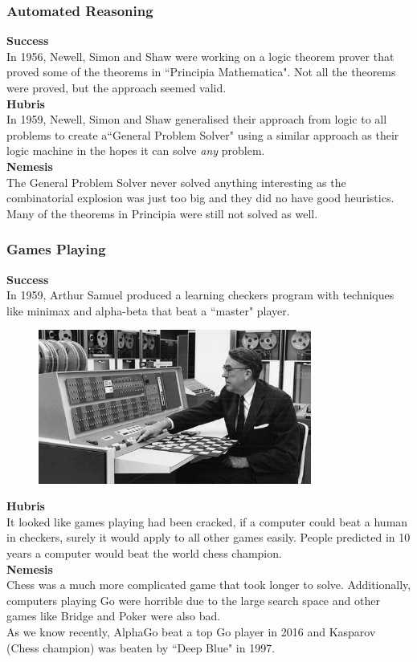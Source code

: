 \documentclass{article}
\newcommand{\n}[0]{\\[\baselineskip]}
\begin{document}
\subsubsection{Automated Reasoning}
\textbf{Success} \\
In 1956, Newell, Simon and Shaw were working on a logic theorem prover that proved some of the theorems in ``Principia Mathematica". Not all the theorems were proved, but the approach seemed valid. 
\n
\textbf{Hubris} \\
In 1959, Newell, Simon and Shaw generalised their approach from logic to all problems to create a``General Problem Solver" using a similar approach as their logic machine in the hopes it can solve \textit{any} problem.
\n
\textbf{Nemesis} \\
The General Problem Solver never solved anything interesting as the combinatorial explosion was just too big and they did no have good heuristics. Many of the theorems in Principia were still not solved as well.

\subsubsection{Games Playing}
\textbf{Success} \\
In 1959, Arthur Samuel produced a learning checkers program with techniques like minimax and alpha-beta that beat a ``master" player. 
\begin{figure}[H]
\centering
\includegraphics[width=0.8\textwidth, keepaspectratio]{imgs/samuel.jpg}
\end{figure}
\noindent
\textbf{Hubris} \\
It looked like games playing had been cracked, if a computer could beat a human in checkers, surely it would apply to all other games easily. People predicted in 10 years a computer would beat the world chess champion.
\n
\textbf{Nemesis} \\
Chess was a much more complicated game that took longer to solve. Additionally, computers playing Go were horrible due to the large search space and other games like Bridge and Poker were also bad.
\n
As we know recently, AlphaGo beat a top Go player in 2016 and Kasparov (Chess champion) was beaten by ``Deep Blue" in 1997.
\end{document}
